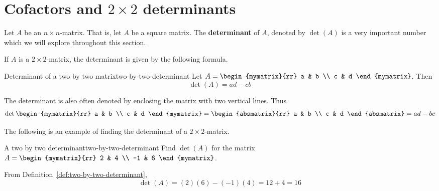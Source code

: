 \section{Cofactors and \texorpdfstring{$2\times 2$}{2x2} determinants}

Let $A$ be an $n\times n$-matrix. That is, let $A$ be a square matrix. The \textbf{determinant} of $A$, denoted
by $\det (A) $ is a very important number which we will explore throughout this section. 

If $A$ is a $2\times 2$-matrix, the determinant is given by the following formula.

\begin{definition}{Determinant of a two by two matrix}{two-by-two-determinant}
Let $A=\begin{mymatrix}{rr}
a & b \\
c & d
\end{mymatrix}$. Then
\begin{equation*}
\det (A)  = ad-cb
\end{equation*}
\end{definition}

The determinant is also often denoted by enclosing the matrix with two
vertical lines. Thus
\begin{equation*}
\det \begin{mymatrix}{rr}
a & b \\
c & d
\end{mymatrix} =\begin{absmatrix}{rr}
a & b \\
c & d
\end{absmatrix} 
=ad - bc
\end{equation*}

The following is an example of finding the determinant of a $2 \times 2$-matrix.

\begin{example}{A two by two determinant}{two-by-two-determinant}
Find $\det(A) $ for the matrix
$A =  \begin{mymatrix}{rr}
2 & 4 \\
-1 & 6
\end{mymatrix}$.
\end{example}

\begin{solution} From Definition~\ref{def:two-by-two-determinant},
\begin{equation*}
\det (A) = (2) (6) -(
-1) (4) = 12 + 4 = 16
\end{equation*}
\end{solution} 

